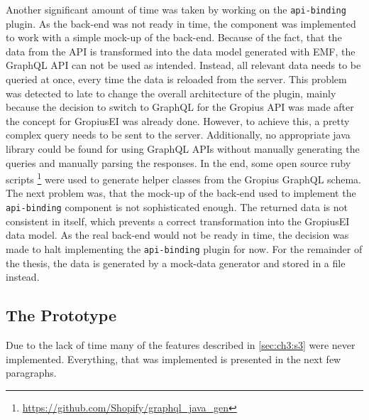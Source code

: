 Another significant amount of time was taken by working on the \lstinline|api-binding| plugin.
As the back-end was not ready in time, the component was implemented to work with a simple mock-up of the back-end.
Because of the fact, that the data from the \gls{API} is transformed into the data model generated with \gls{EMF}, 
the GraphQL \gls{API} can not be used as intended.
Instead, all relevant data needs to be queried at once, every time the data is reloaded from the server.
This problem was detected to late to change the overall architecture of the plugin, 
mainly because the decision to switch to GraphQL for the Gropius \gls{API} was made after the concept for \gls{GropiusEI} was already done.
However, to achieve this, a pretty complex query needs to be sent to the server.
Additionally, no appropriate java library could be found for using GraphQL \glspl{API} without manually generating the queries and manually parsing the responses. 
In the end, some open source ruby scripts \footnote{\url{https://github.com/Shopify/graphql_java_gen}} were used to generate helper classes from the Gropius GraphQL schema.
The next problem was, that the mock-up of the back-end used to implement the \lstinline|api-binding| component is not sophisticated enough.
The returned data is not consistent in itself, which prevents a correct transformation into the \gls{GropiusEI} data model.
As the real back-end would not be ready in time, the decision was made to halt implementing the \lstinline|api-binding| plugin for now.
For the remainder of the thesis, the data is generated by a mock-data generator and stored in a file instead.

\subsection*{The Prototype}
Due to the lack of time many of the features described in \cref{sec:ch3:s3} were never implemented.
Everything, that was implemented is presented in the next few paragraphs.

